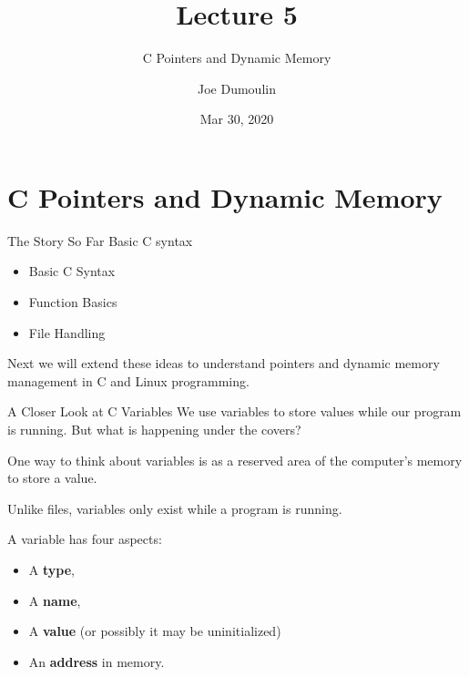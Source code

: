 \documentclass[10pt]{beamer}
\title{Lecture 5}
\subtitle{C Pointers and Dynamic Memory}
\date{Mar 30, 2020}
\author{Joe Dumoulin}
\institute{Eastern Washington University}
\begin{document}
\maketitle
\section{C Pointers and Dynamic Memory} 



\begin{frame}[fragile]{The Story So Far}
Basic C syntax

\begin{itemize}

\item Basic C Syntax
\item Function Basics
\item File Handling

\end{itemize}

Next we will extend these ideas to understand pointers and dynamic memory management in C and Linux programming.

\end{frame}
\begin{frame}[fragile]{A Closer Look at C Variables}
We use variables to store values while our program is running.  But what is happening under the covers?

One way to think about variables is as a reserved area of the computer's memory to store a value.  

Unlike files, variables only exist while a program is running.

A variable has four aspects:
\begin{itemize}
\item A \textbf{type},
\item A \textbf{name},
\item A \textbf{value} (or possibly it may be uninitialized)
\item An \textbf{address}  in memory.
\end{itemize}

\end{frame}
\end{document}

